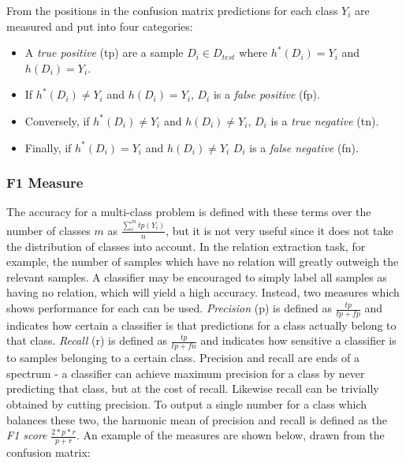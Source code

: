 \begin{center}
\end{center}

From the positions in the confusion matrix predictions for each class $Y_i$ are measured and put into four categories: 

\begin{itemize}
\item A \emph{true positive} (tp) are a sample $D_i \in D_{test}$ where $h^*(D_i) = Y_i$ and $h(D_i) = Y_i$. 
\item If $h^*(D_i) \neq Y_i$ and $h(D_i) = Y_i$, $D_i$ is a \emph{false positive} (fp). 
\item Conversely, if $h^*(D_i) \neq Y_i$ and $h(D_i) \neq Y_i$, $D_i$ is a \emph{true negative} (tn).
\item Finally, if $h^*(D_i) = Y_i$ and $h(D_i) \neq Y_i$ $D_i$ is a \emph{false negative} (fn).\\ 
\end{itemize}

\subsubsection{F1 Measure}
The accuracy for a multi-class problem is defined with these terms over the number of classes $m$ as $\frac{\sum_{i}^{m} tp(Y_i)}{n} $, but it is not very useful since it does not take the distribution of classes into account. In the relation extraction task, for example, the number of samples which have no relation will greatly outweigh the relevant samples. A classifier may be encouraged to simply label all samples as having no relation, which will yield a high accuracy. Instead, two measures which shows performance for each can be used. \emph{Precision} (p) is defined as $\frac{tp} {tp+fp}$ and indicates how certain a classifier is that predictions for a class actually belong to that class. \emph{Recall} (r) is defined as $\frac{tp}{tp+fn}$ and indicates how sensitive a classifier is to samples belonging to a certain class. Precision and recall are ends of a spectrum - a classifier can achieve maximum precision for a class by never predicting that class, but at the cost of recall. Likewise recall can be trivially obtained by cutting precision. To output a single number for a class which balances these two, the harmonic mean of precision and recall is defined as the \emph{F1 score} $\frac{2 * p * r}{p + r}$. An example of the measures are shown below, drawn from the confusion matrix:


